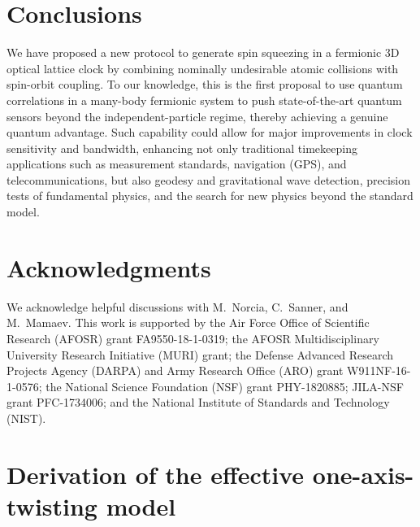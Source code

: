 \documentclass[aps,prx,superscriptaddress,notitlepage,twocolumn,longbibliography]{revtex4-2}
\begin{document}
\section{Conclusions}

We have proposed a new protocol to generate spin squeezing in a fermionic 3D optical lattice clock by combining nominally undesirable atomic collisions with spin-orbit coupling.
To our knowledge, this is the first proposal to use quantum correlations in a many-body fermionic system to push state-of-the-art quantum sensors beyond the independent-particle regime, thereby achieving a genuine quantum advantage.
Such capability could allow for major improvements in clock sensitivity and bandwidth, enhancing not only traditional timekeeping applications such as measurement standards, navigation (GPS), and telecommunications, but also geodesy and gravitational wave detection, precision tests of fundamental physics, and the search for new physics beyond the standard model\cite{safronova2018search}.


\section{Acknowledgments}

We acknowledge helpful discussions with M.~Norcia, C.~Sanner, and M.~Mamaev.
This work is supported by the Air Force Office of Scientific Research (AFOSR) grant FA9550-18-1-0319; the AFOSR Multidisciplinary University Research Initiative (MURI) grant; the Defense Advanced Research Projects Agency (DARPA) and Army Research Office (ARO) grant W911NF-16-1-0576; the National Science Foundation (NSF) grant PHY-1820885; JILA-NSF grant PFC-1734006; and the National Institute of Standards and Technology (NIST).


\appendix

\renewcommand\thefigure{\thesection\arabic{figure}}

\section{Derivation of the effective one-axis-twisting model}
\label{sec:derivation_OAT}
\end{document}
